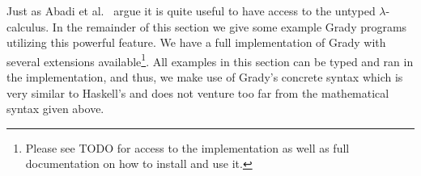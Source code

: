 Just as Abadi et al.~\cite{Abadi:1989} argue it is quite useful to
have access to the untyped $\lambda$-calculus.  In the remainder of
this section we give some example Grady programs utilizing this
powerful feature.  We have a full implementation of Grady with several
extensions available\footnote{Please see TODO for access to the
  implementation as well as full documentation on how to install and
  use it.}.  All examples in this section can be typed and ran in the
implementation, and thus, we make use of Grady's concrete syntax which
is very similar to Haskell's and does not venture too far from the
mathematical syntax given above.

